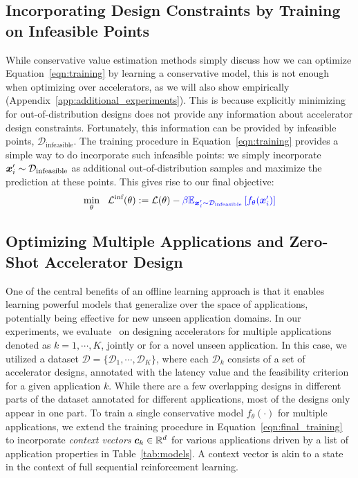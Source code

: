 \subsection{Incorporating Design Constraints by Training on Infeasible Points}
While conservative value estimation methods simply discuss how we can optimize Equation~\ref{eqn:training} by learning a conservative model, this is not enough when optimizing over accelerators, as we will also show empirically (Appendix~\ref{app:additional_experiments}).
This is because explicitly minimizing for out-of-distribution designs does not provide any information about accelerator design constraints. Fortunately, this information can be provided by infeasible points, $\mathcal{D}_\text{infeasible}$. The training procedure in Equation~\ref{eqn:training} provides a simple way to do incorporate such infeasible points: we simply incorporate ${\boldsymbol{x}}'_i \sim \mathcal{D}_{\text{infeasible}}$ as additional out-of-distribution samples and maximize the prediction at these points.
This gives rise to our final objective:
\begin{equation}
\label{eqn:final_training}
    \min_\theta~~ \mathcal{L}^\text{inf}(\theta) := \mathcal{L}(\theta)
    - \textcolor{blue}{\beta \mathbb{E}_{{\boldsymbol{x}}'_i \sim \mathcal{D}_{\text{infeasible}}}\left[ f_\theta({\boldsymbol{x}}'_i) \right]}
\end{equation}

\subsection{Optimizing Multiple Applications and Zero-Shot Accelerator Design}
%
One of the central benefits of an offline learning approach is that it enables learning powerful models that generalize over the space of applications, potentially being effective for new unseen application domains. In our experiments, we evaluate \primemethodname\ on designing accelerators for multiple applications denoted as $k=1, \cdots, K$, jointly or for a novel unseen application. In this case, we utilized a dataset $\mathcal{D} = \{\mathcal{D}_1, \cdots, \mathcal{D}_K\}$, where each $\mathcal{D}_k$ consists of a set of accelerator designs, annotated with the latency value and the feasibility criterion for a given application $k$. While there are a few overlapping designs in different parts of the dataset annotated for different applications, most of the designs only appear in one part. To train a single conservative model $f_\theta(\cdot)$ for multiple applications, we extend the training procedure in Equation~\ref{eqn:final_training} to incorporate \textit{context vectors} ${\boldsymbol{c}}_k \in \mathbb{R}^d$ for various applications driven by a list of application properties in Table~\ref{tab:models}. A context vector is akin to a state in the context of full sequential reinforcement learning. 

